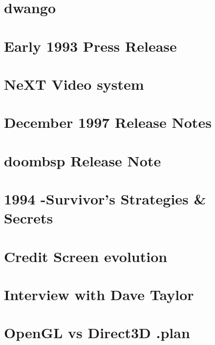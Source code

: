 \documentclass{book}
\begin{document}
      \chapter{dwango}
      
      \chapter{Early 1993 Press Release}
      
      \chapter{NeXT Video system}
      
      \chapter{December 1997 Release Notes}
      
      \chapter{doombsp Release Note}
      
      \chapter{1994 -Survivor's Strategies \& Secrets}
      
      \chapter{Credit Screen evolution}
      
      \chapter{Interview with Dave Taylor}
      
      \chapter{OpenGL vs Direct3D .plan}
      
    \cleartoleftpage %
    
    \blankpage
    \blankpage
\end{document}

